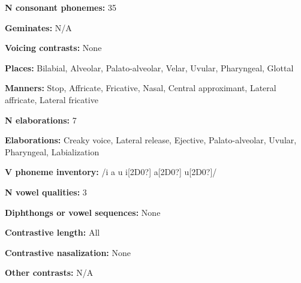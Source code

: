 \begin{styleBody}
\textbf{N consonant phonemes:} 35
\end{styleBody}

\begin{styleBody}
\textbf{Geminates:} N/A
\end{styleBody}

\begin{styleBody}
\textbf{Voicing contrasts:} None
\end{styleBody}

\begin{styleBody}
\textbf{Places:} Bilabial, Alveolar, Palato-alveolar, Velar, Uvular, Pharyngeal, Glottal
\end{styleBody}

\begin{styleBody}
\textbf{Manners:} Stop, Affricate, Fricative, Nasal, Central approximant, Lateral affricate, Lateral fricative
\end{styleBody}

\begin{styleBody}
\textbf{N elaborations:} 7
\end{styleBody}

\begin{styleBody}
\textbf{Elaborations:} Creaky voice, Lateral release, Ejective, Palato-alveolar, Uvular, Pharyngeal, Labialization
\end{styleBody}

\begin{styleBody}
\textbf{V phoneme inventory:} /i a u i[2D0?] a[2D0?] u[2D0?]/
\end{styleBody}

\begin{styleBody}
\textbf{N vowel qualities:} 3
\end{styleBody}

\begin{styleBody}
\textbf{Diphthongs or vowel sequences:} None
\end{styleBody}

\begin{styleBody}
\textbf{Contrastive length:} All
\end{styleBody}

\begin{styleBody}
\textbf{Contrastive nasalization:} None
\end{styleBody}

\begin{styleBody}
\textbf{Other contrasts:} N/A
\end{styleBody}

